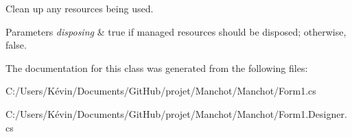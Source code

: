 Clean up any resources being used. 


\begin{DoxyParams}{Parameters}
{\em disposing} & true if managed resources should be disposed; otherwise, false.\\
\hline
\end{DoxyParams}


The documentation for this class was generated from the following files\+:\begin{DoxyCompactItemize}
\item 
C\+:/\+Users/\+Kévin/\+Documents/\+Git\+Hub/projet/\+Manchot/\+Manchot/Form1.\+cs\item 
C\+:/\+Users/\+Kévin/\+Documents/\+Git\+Hub/projet/\+Manchot/\+Manchot/Form1.\+Designer.\+cs\end{DoxyCompactItemize}
